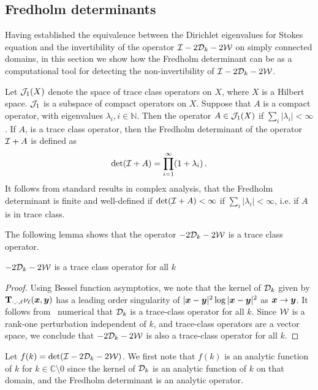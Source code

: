 \subsection{Fredholm determinants}
Having established the equivalence between the Dirichlet eigenvalues
for Stokes equation and the invertibility of
the operator $\mathcal I - 2{\mathcal D}_{k} - 2{\mathcal W}$ on simply connected domains, in this section
we show how the Fredholm determinant can be as a computational tool for detecting
the non-invertibility of $\mathcal I - 2{\mathcal D}_{k} - 2{\mathcal W}$.

Let ${\mathcal J}_{1}(X)$ denote the space of trace class operators 
on $X$, where $X$ is a Hilbert space.
${\mathcal J}_{1}$ is a subspace of compact operators on $X$.
Suppose that $A$ is a compact operator, with eigenvalues
$\lambda_{i}, i\in \mathbb{N}$.
Then the operator $A \in {\mathcal J}_{1}(X)$ if
$\sum_{i} |\lambda_{i}| < \infty$.
If $A$, is a trace class operator, then  
the Fredholm determinant of the operator $\mathcal I + A$ is defined as
\begin{equation}
\text{det}(\mathcal I +A) = \prod_{i=1}^{\infty} (1+\lambda_{i}) \, .
\end{equation}
It follows from standard results in complex analysis, 
that the Fredholm determinant is finite and well-defined if 
$\text{det}(\mathcal I+A) < \infty$ if $\sum_{i} |\lambda_{i}| < \infty$,
i.e. if $A$ is in trace class.

The following lemma shows that the operator 
$-2{\mathcal D}_{k} - 2{\mathcal W}$ is a trace class operator.
\begin{lemma} 
$-2{\mathcal D}_{k} - 2{\mathcal W}$ is a trace class operator for all $k$ 
\end{lemma}
\begin{proof}
Using Bessel function asymptotics, we note that the
kernel of ${\mathcal D}_{k}$ given by
${\bf T}_{\cdot,\cdot,\ell}\nu_{\ell}({\boldsymbol x},{\boldsymbol y})$
has a leading order singularity of $|{\boldsymbol x}-{\boldsymbol y}|^2 \log{|{\boldsymbol x}-{\boldsymbol y}|^2}$ as ${\boldsymbol x}\to {\boldsymbol y}$.
It follows from~\cite{bornemann2010numerical} numerical that ${\mathcal D}_{k}$
is a trace-class operator for all $k$.
Since ${\mathcal W}$ is a rank-one perturbation independent of $k$, and trace-class
operators are a vector space, we conclude that
$-2{\mathcal D}_{k} - 2{\mathcal W}$ is also a trace-class operator for all $k$.
\end{proof}

Let $f(k) = \text{det}(\mathcal I - 2{\mathcal D}_{k} - 2{\mathcal W})$.
We first note that $f(k)$ is an analytic function of $k$
for $k \in \mathbb{C} \setminus 0$
since the kernel of ${\mathcal D}_{k}$ is an 
analytic function of $k$ on that domain, 
and the Fredholm determinant is an analytic operator.

